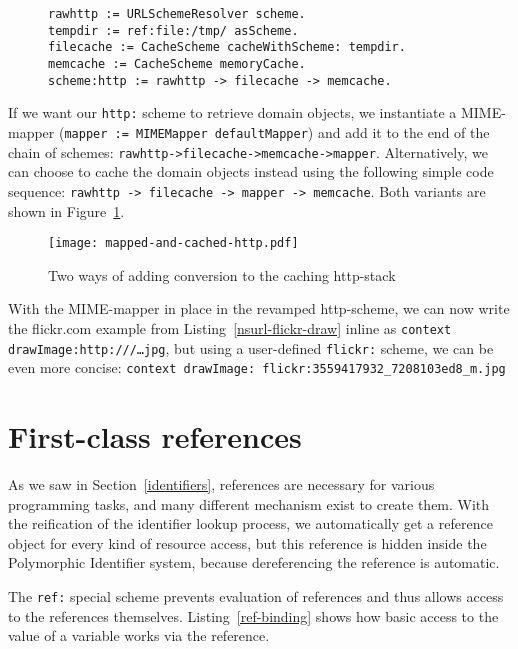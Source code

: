 \documentclass[preprint]{sigplanconf}
\begin{document}
\begin{figure}[htbp]
\begin{lstlisting}[style=numbers,label=http-composed-listing,caption=Code for caching http stack.]
rawhttp := URLSchemeResolver scheme.
tempdir := ref:file:/tmp/ asScheme.
filecache := CacheScheme cacheWithScheme: tempdir.
memcache := CacheScheme memoryCache.
scheme:http := rawhttp -> filecache -> memcache.
\end{lstlisting}
\end{figure}

If we want our {\tt http:} scheme to retrieve domain objects, we instantiate a MIME-mapper
({\tt mapper := MIMEMapper defaultMapper}) and add it to the end of the chain of schemes: 
{\tt rawhttp->filecache->memcache->mapper}.  Alternatively, we can choose to cache the
domain objects instead using the following simple code sequence: {\tt rawhttp -> filecache -> mapper -> memcache}.
Both variants are shown in Figure~\ref{http-cached-converted}.


\begin{figure}[htbp]
\centering
\texttt{[image: mapped-and-cached-http.pdf]}
\caption{Two ways of adding conversion to the caching http-stack}
\label{http-cached-converted}
\end{figure}


With the MIME-mapper in place in the revamped http-scheme, we can now 
write the flickr.com example from Listing~\ref{nsurl-flickr-draw} inline as {\tt context drawImage:http:///{\ldots}jpg},
but using a user-defined {\tt flickr:} scheme, we can be even more concise:  
{\tt context drawImage: flickr:3559417932\_7208103ed8\_m.jpg}


\section{First-class references}
\label{references}

As we saw in Section~\ref{identifiers}, references are necessary for various programming tasks,
and many different mechanism exist to create them.   With the reification of the identifier lookup
process, we automatically get a reference object for every kind of resource access, but this
reference is hidden inside the Polymorphic Identifier system, because dereferencing the
reference is automatic.

The {\tt ref:} special scheme prevents evaluation of references and thus allows access
to the references themselves.  Listing~\ref{ref-binding} shows how basic access to
the value of a variable works via the reference.
\end{document}
